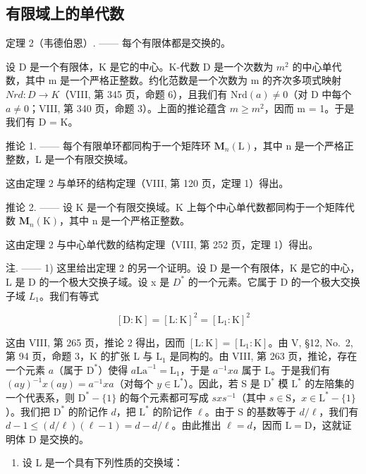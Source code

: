 \subsection{有限域上的单代数}

定理 2（韦德伯恩）. —— 每个有限体都是交换的。

设 D 是一个有限体，K 是它的中心。K-代数 D 是一个次数为 \(m^{2}\) 的中心单代数，其中 m 是一个严格正整数。约化范数是一个次数为 m 的齐次多项式映射 \(Nrd : D \to K\)（VIII, 第 345 页，命题 6），且我们有 \(\text{Nrd}(a) \neq 0\)（对 D 中每个 \(a \neq 0\)；VIII, 第 340 页，命题 3）。上面的推论蕴含 \(m \geqslant m^{2}\)，因而 m = 1。于是我们有 D = K。

推论 1. —— 每个有限单环都同构于一个矩阵环 \(\mathbf{M}_{n}(\mathrm{L})\)，其中 n 是一个严格正整数，L 是一个有限交换域。

这由定理 2 与单环的结构定理（VIII, 第 120 页，定理 1）得出。

推论 2. —— 设 K 是一个有限交换域。K 上每个中心单代数都同构于一个矩阵代数 \(\mathbf{M}_{n}(\mathrm{K})\)，其中 n 是一个严格正整数。

这由定理 2 与中心单代数的结构定理（VIII, 第 252 页，定理 1）得出。

注. —— 1) 这里给出定理 2 的另一个证明。设 D 是一个有限体，K 是它的中心，L 是 D 的一个极大交换子域。设 x 是 \(D^{*}\) 的一个元素。它属于 D 的一个极大交换子域 \(L_{1}\)。我们有等式

\[
[ \mathrm{D}: \mathrm{K} ] = [ \mathrm{L}: \mathrm{K} ] ^ {2} = [ \mathrm{L} _ {1}: \mathrm{K} ] ^ {2}
\]

这由 VIII, 第 265 页，推论 2 得出，因而 \([\mathrm{L}:\mathrm{K}] = [\mathrm{L}_1:\mathrm{K}]\)。由 V, §12, No.~2, 第 94 页，命题 3，K 的扩张 L 与 \(\mathrm{L}_1\) 是同构的。由 VIII, 第 263 页，推论，存在一个元素 \(a\)（属于 \(\mathrm{D}^*\)）使得 \(a\mathrm{La}^{-1} = \mathrm{L}_1\)，于是 \(a^{-1}xa\) 属于 L。于是我们有 \((ay)^{-1}x(ay) = a^{-1}xa\)（对每个 \(y\in \mathrm{L}^*\)）。因此，若 S 是 \(\mathrm{D}^*\) 模 \(\mathrm{L}^*\) 的左陪集的一个代表系，则 \(\mathrm{D}^* -\{1\}\) 的每个元素都可写成 \(sxs^{-1}\)（其中 \(s\in \mathrm{S}\)，\(x\in \mathrm{L}^* -\{1\}\)）。我们把 \(\mathrm{D}^*\) 的阶记作 \(d\)，把 \(\mathrm{L}^*\) 的阶记作 \(\ell\)。由于 S 的基数等于 \(d / \ell\)，我们有 \(d - 1\leqslant (d / \ell)(\ell -1) = d - d / \ell\)。由此推出 \(\ell = d\)，因而 \(\mathrm{L} = \mathrm{D}\)，这就证明体 D 是交换的。

\begin{enumerate}
\def\labelenumi{\arabic{enumi})}
\setcounter{enumi}{1}
\tightlist
\item
  设 L 是一个具有下列性质的交换域：
\end{enumerate}

